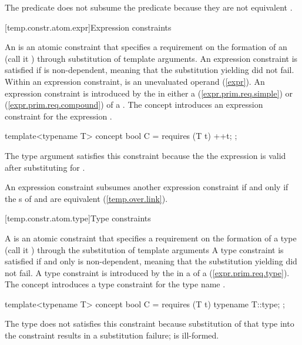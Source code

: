 \enterexample
The predicate  does not subsume the predicate
 because they are not equivalent
.
\exitexample
          

[temp.constr.atom.expr]{Expression constraints}

\pnum
An  is an atomic constraint
that specifies a requirement on the formation of an
 (call it )
through substitution of template arguments.
% 
An expression constraint is satisfied if  is non-dependent, 
meaning that the substitution yielding  did not fail. 
Within an expression constraint,  is an unevaluated 
operand (\ref{expr}).
% 
\enternote
An expression constraint is introduced by the 
 in either a
(\ref{expr.prim.req.simple}) or
(\ref{expr.prim.req.compound}) of a
.
\exitnote
% 
\enterexample
The concept  introduces an expression constraint for 
the expression .
\begin{codeblock}
template<typename T> concept bool C = requires (T t) { ++t; };
\end{codeblock}
The type argument  satisfies this constraint because the
the expression  is valid after substituting 
for .
\exitexample
          

\pnum
An expression constraint  subsumes another
expression constraint  if and only if
the s of 
and  are equivalent 
(\ref{temp.over.link}). 


[temp.constr.atom.type]{Type constraints}

\pnum
A  is an atomic constraint that
specifies a requirement on the formation 
of a type (call it ) through the substitution of
template arguments
% 
A type constraint is satisfied if and only 
 is non-dependent, meaning that the substitution 
yielding  did not fail.
% 
\enternote
A type constraint is introduced by the 
 in a
 of a
(\ref{expr.prim.req.type}).
\exitnote
% 
\enterexample
The concept  introduces a type constraint for the 
type name .
\begin{codeblock}
template<typename T> concept bool C = 
  requires (T t) { 
    typename T::type;
  };
\end{codeblock}
The type  does not satisfies this constraint 
because substitution of that type into the constraint results in a
substitution failure;  is ill-formed.
\exitexample
          

